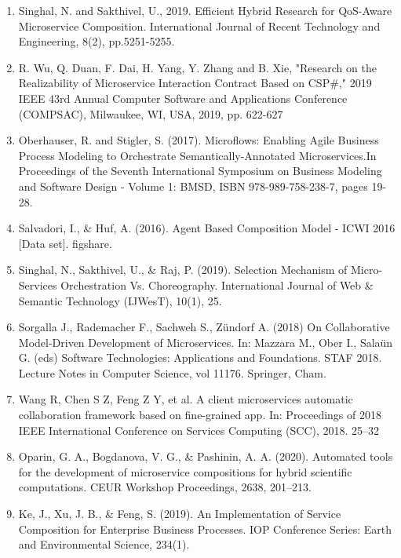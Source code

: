 \documentclass{article}
\begin{document}
\begin{enumerate}
\item Singhal, N. and Sakthivel, U., 2019. Efficient Hybrid Research for QoS-Aware Microservice Composition. International Journal of Recent Technology and Engineering, 8(2), pp.5251-5255.

\item R. Wu, Q. Duan, F. Dai, H. Yang, Y. Zhang and B. Xie, "Research on the Realizability of Microservice Interaction Contract Based on CSP\#," 2019 IEEE 43rd Annual Computer Software and Applications Conference (COMPSAC), Milwaukee, WI, USA, 2019, pp. 622-627

\item Oberhauser, R. and Stigler, S. (2017). Microflows: Enabling Agile Business Process Modeling to Orchestrate Semantically-Annotated Microservices.In Proceedings of the Seventh International Symposium on Business Modeling and Software Design - Volume 1: BMSD, ISBN 978-989-758-238-7, pages 19-28.

\item Salvadori, I., \& Huf, A. (2016). Agent Based Composition Model - ICWI 2016 [Data set]. figshare.

\item Singhal, N., Sakthivel, U., \& Raj, P. (2019). Selection Mechanism of Micro-Services Orchestration Vs. Choreography. International Journal of Web \& Semantic Technology (IJWesT), 10(1), 25.

\item Sorgalla J., Rademacher F., Sachweh S., Zündorf A. (2018) On Collaborative Model-Driven Development of Microservices. In: Mazzara M., Ober I., Salaün G. (eds) Software Technologies: Applications and Foundations. STAF 2018. Lecture Notes in Computer Science, vol 11176. Springer, Cham.

\item Wang R, Chen S Z, Feng Z Y, et al. A client microservices automatic collaboration framework based on fine-grained app. In: Proceedings of 2018 IEEE International Conference on Services Computing (SCC), 2018. 25–32

\item Oparin, G. A., Bogdanova, V. G., \& Pashinin, A. A. (2020). Automated tools for the development of microservice compositions for hybrid scientific computations. CEUR Workshop Proceedings, 2638, 201–213. 

\item Ke, J., Xu, J. B., \& Feng, S. (2019). An Implementation of Service Composition for Enterprise Business Processes. IOP Conference Series: Earth and Environmental Science, 234(1). 


\end{enumerate}
\end{document}
